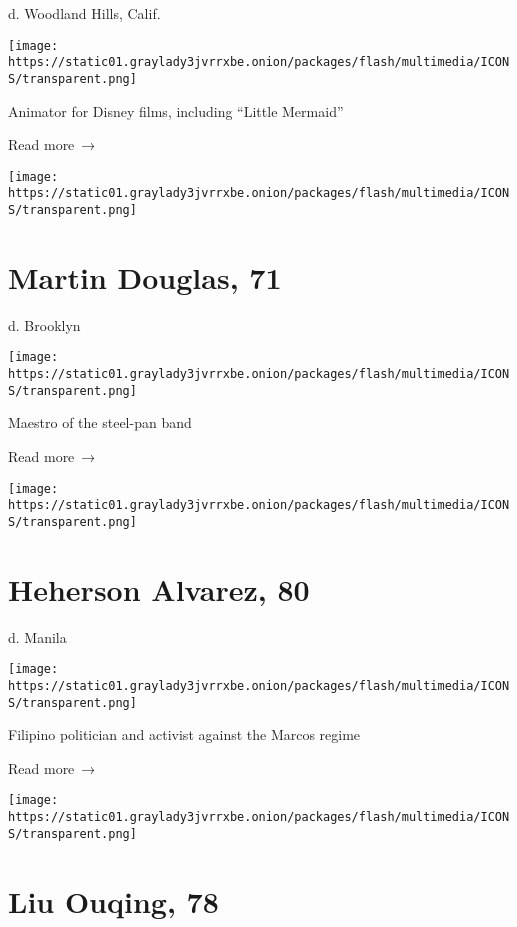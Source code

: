 d. Woodland Hills, Calif.

\texttt{[image: https://static01.graylady3jvrrxbe.onion/packages/flash/multimedia/ICONS/transparent.png]}

Animator for Disney films, including ``Little Mermaid''

 Read more~→

\href{https://www.nytimes3xbfgragh.onion/2020/04/21/obituaries/martin-douglas-dead-coronavirus.html}{}

\texttt{[image: https://static01.graylady3jvrrxbe.onion/packages/flash/multimedia/ICONS/transparent.png]}

\hypertarget{martin-douglas-71}{%
\section{Martin Douglas, 71}\label{martin-douglas-71}}

d. Brooklyn

\texttt{[image: https://static01.graylady3jvrrxbe.onion/packages/flash/multimedia/ICONS/transparent.png]}

Maestro of the steel-pan band

 Read more~→

\href{https://www.nytimes3xbfgragh.onion/2020/04/21/obituaries/heherson-alvarez-coronavirus-dead.html}{}

\texttt{[image: https://static01.graylady3jvrrxbe.onion/packages/flash/multimedia/ICONS/transparent.png]}

\hypertarget{heherson-alvarez-80}{%
\section{Heherson Alvarez, 80}\label{heherson-alvarez-80}}

d. Manila

\texttt{[image: https://static01.graylady3jvrrxbe.onion/packages/flash/multimedia/ICONS/transparent.png]}

Filipino politician and activist against the Marcos regime

 Read more~→

\href{https://www.nytimes3xbfgragh.onion/2020/04/21/obituaries/ouqing-liu-coronavirus-dead.html}{}

\texttt{[image: https://static01.graylady3jvrrxbe.onion/packages/flash/multimedia/ICONS/transparent.png]}

\hypertarget{liu-ouqing-78}{%
\section{Liu Ouqing, 78}\label{liu-ouqing-78}}

